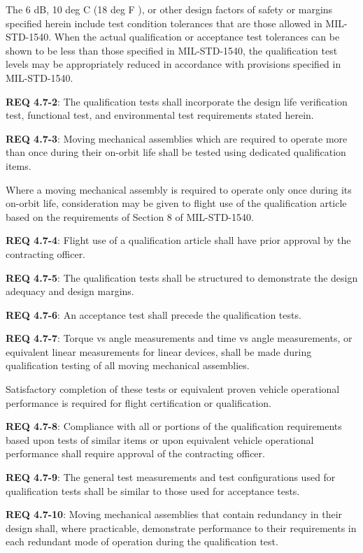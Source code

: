 \documentclass[12pt]{article}
\begin{document}
The 6 dB, 10 deg C (18 deg F ), or other design factors of safety or margins specified herein include test condition tolerances that are those allowed in MIL-STD-1540. 
When the actual qualification or acceptance test tolerances can be shown to be less than those specified in MIL-STD-1540, the qualification test levels may be appropriately reduced in accordance with provisions specified in MIL-STD-1540. 

\noindent \textbf{REQ 4.7-2}: The qualification tests shall incorporate the design life verification test, functional test, and environmental test requirements stated herein. 

\noindent \textbf{REQ 4.7-3}: Moving mechanical assemblies which are required to operate more than once during their on-orbit life shall be tested using dedicated qualification items. 

Where a moving mechanical assembly is required to operate only once during its on-orbit life, consideration may be given to flight use of the qualification article based on the requirements of Section 8 of MIL-STD-1540. 

\noindent \textbf{REQ 4.7-4}: Flight use of a qualification article shall have prior approval by the contracting officer. 

\noindent \textbf{REQ 4.7-5}: The qualification tests shall be structured to demonstrate the design adequacy and design margins. 

\noindent \textbf{REQ 4.7-6}: An acceptance test shall precede the qualification tests. 

\noindent \textbf{REQ 4.7-7}: Torque vs angle measurements and time vs angle measurements, or equivalent linear measurements for linear devices, shall be made during qualification testing of all moving mechanical assemblies.

Satisfactory completion of these tests or equivalent proven vehicle operational performance is required for flight certification or qualification. 

\noindent \textbf{REQ 4.7-8}: Compliance with all or portions of the qualification requirements based upon tests of similar items or upon equivalent vehicle operational performance shall require approval of the contracting officer. 

\noindent \textbf{REQ 4.7-9}: The general test measurements and test configurations used for qualification tests shall be similar to those used for acceptance tests.

\noindent \textbf{REQ 4.7-10}: Moving mechanical assemblies that contain redundancy in their design shall, where practicable, demonstrate performance to their requirements in each redundant mode of operation during the qualification test. 
\end{document}
